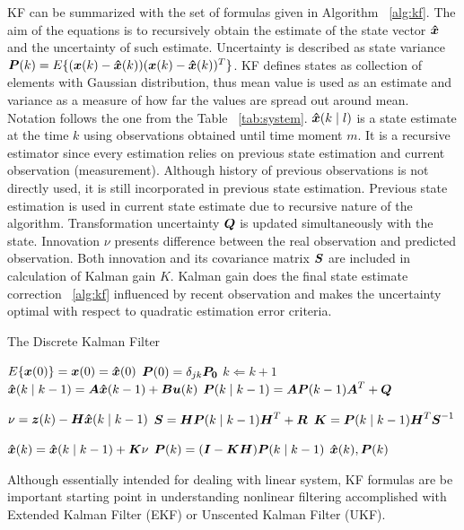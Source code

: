 KF can be summarized with the set of formulas given in Algorithm ~\ref{alg:kf}. The aim of the equations is to recursively obtain the estimate of the state vector ${\boldsymbol{\hat{x}}}$ and the uncertainty of such estimate. Uncertainty is described as state variance $\boldsymbol{P}(k) = E\lbrace (\boldsymbol{x}(k) - \boldsymbol{\hat{x}}(k)) (\boldsymbol{x}(k) - \boldsymbol{\hat{x}}(k))^{T} \rbrace$. KF defines states as collection of elements with Gaussian distribution, thus mean value is used as an estimate and variance as a measure of how far the values are spread out around mean. Notation follows the one from the Table ~\ref{tab:system}. $\boldsymbol{\hat{x}}(k \mid l)$ is a state estimate at the time $k$ using observations obtained until time moment $m$. It is a recursive estimator since every estimation relies on previous state estimation and current observation (measurement). Although history of previous observations is not directly used, it is still incorporated in previous state estimation. Previous state estimation is used in current state estimate due to recursive nature of the algorithm. Transformation uncertainty $\boldsymbol{Q}$ is updated simultaneously with the state. Innovation $\nu$ presents difference between the real observation and predicted observation. Both innovation and its covariance matrix $\boldsymbol{S}$ are included in calculation of Kalman gain $K$. Kalman gain does the final state estimate correction ~\ref{alg:kf} influenced by recent observation and makes the uncertainty optimal with respect to quadratic estimation error criteria.
\begin{algorithm}%
\caption{The Discrete Kalman Filter} \label{alg:kf}
\begin{algorithmic}
\REQUIRE $E\lbrace \boldsymbol{x}(0) \rbrace = \boldsymbol{x}(0) = \boldsymbol{\hat{x}}(0)$
\REQUIRE $\boldsymbol{P}(0) = \delta_{jk} \boldsymbol{P_{0}} $ 
\LOOP 
	\STATE $k \Leftarrow k+1$ 
	\STATE $\boldsymbol{\hat{x}}(k \mid k-1) = \boldsymbol{A} \boldsymbol{\hat{x}}(k-1) + \boldsymbol{B} \boldsymbol{u}(k)$
	\STATE $\boldsymbol{P}(k \mid k-1) = \boldsymbol{A} \boldsymbol{P}(k-1) \boldsymbol{A}^{T} + \boldsymbol{Q}$
	
	\STATE $\nu = \boldsymbol{z}(k) - \boldsymbol{H} \boldsymbol{\hat{x}}(k \mid k-1)$	
	\STATE $\boldsymbol{S} = \boldsymbol{H} \boldsymbol{P}(k \mid k-1) \boldsymbol{H}^{T} + \boldsymbol{R}$	
	\STATE $\boldsymbol{K} = \boldsymbol{P}(k \mid k-1) \boldsymbol{H}^{T} \boldsymbol{S}^{-1}$	
	
	\STATE $\boldsymbol{\hat{x}}(k) = \boldsymbol{\hat{x}}(k \mid k-1) + \boldsymbol{K} \nu$
	\STATE $\boldsymbol{P}(k) = (\boldsymbol{I}-\boldsymbol{K}\boldsymbol{H})\boldsymbol{P}(k \mid k-1)$
	\RETURN $\boldsymbol{\hat{x}}(k), \boldsymbol{P}(k)$
\ENDLOOP
\end{algorithmic}
\end{algorithm}
Although essentially intended for dealing with linear system, KF formulas are be important starting point in understanding nonlinear filtering accomplished with Extended Kalman Filter (EKF) or Unscented Kalman Filter (UKF).

